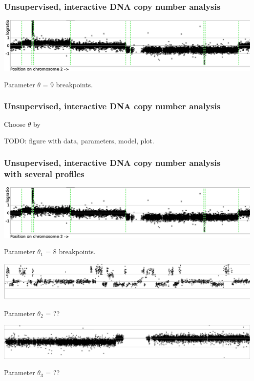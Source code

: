 \documentclass{beamer}
\begin{document}
\begin{frame}
  \frametitle{Unsupervised, interactive DNA copy number analysis}
  \includegraphics[width=\textwidth]{unlabeled-breakpoints-9}

  Parameter $\theta$ = 9 breakpoints.
\end{frame}

\begin{frame}
  \frametitle{Unsupervised, interactive DNA copy number analysis}
  
  Choose $\theta$ by 

  TODO: figure with data, parameters, model, plot.
\end{frame}

\begin{frame}
  \frametitle{Unsupervised, interactive DNA copy number analysis\\
  with several profiles}
  \includegraphics[width=\textwidth]{unlabeled-breakpoints-8}

  Parameter $\theta_1$ = 8 breakpoints.

  \vskip 0.1in

  \includegraphics[width=\textwidth]{lots-of-breaks}

  Parameter $\theta_2$ = ??

  \vskip 0.1in

  \includegraphics[width=\textwidth]{only-one-break}

  Parameter $\theta_3$ = ??

\end{frame}
\end{document}
